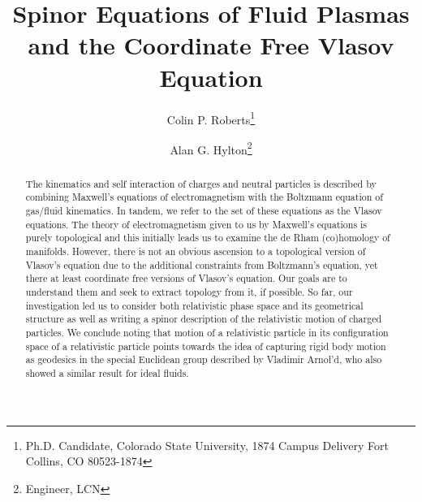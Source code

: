 \documentclass[conf]{new-aiaa}
\title{Spinor Equations of Fluid Plasmas and the Coordinate Free Vlasov Equation}
\author{Colin P. Roberts\footnote{Ph.D. Candidate, Colorado State University, 1874 Campus Delivery Fort Collins, CO 80523-1874}}
\affil{Colorado State University, Fort Collins, Colorado, 80523}
\author{Alan G. Hylton\footnote{Engineer, LCN}}
\affil{NASA Glenn Research Center, Cleveland, Ohio, 44133, USA}
\begin{document}
\maketitle

\begin{abstract}
The kinematics and self interaction of charges and neutral particles is described by combining Maxwell's equations of electromagnetism with the Boltzmann equation of gas/fluid kinematics. In tandem, we refer to the set of these equations as the Vlasov equations. The theory of electromagnetism given to us by Maxwell's equations is purely topological and this initially leads us to examine the de Rham (co)homology of manifolds. However, there is not an obvious ascension to a topological version of Vlasov's equation due to the additional constraints from Boltzmann's equation, yet there at least coordinate free versions of Vlasov's equation. Our goals are to understand them and seek to extract topology from it, if possible. So far, our investigation led us to consider both relativistic phase space and its geometrical structure as well as writing a spinor description of the relativistic motion of charged particles. We conclude noting that motion of a relativistic particle in its configuration space of a relativistic particle points towards the idea of capturing rigid body motion as geodesics in the special Euclidean group described by Vladimir Arnol'd, who also showed a similar result for ideal fluids.
\end{abstract}

%
\end{document}
